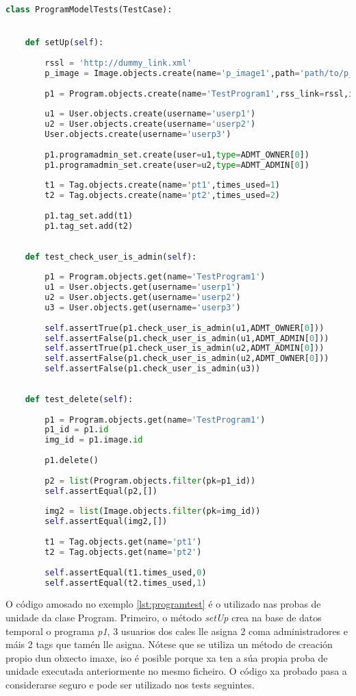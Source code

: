 \begin{lstlisting}[language=Python, caption=Probas de unidade dos metodos de Program, label=lst:programtest]
class ProgramModelTests(TestCase): 


	def setUp(self):
	
		rssl = 'http://dummy_link.xml'
		p_image = Image.objects.create(name='p_image1',path='path/to/p_image1')
		
		p1 = Program.objects.create(name='TestProgram1',rss_link=rssl,image=p_image)
		
		u1 = User.objects.create(username='userp1')
		u2 = User.objects.create(username='userp2')
		User.objects.create(username='userp3')
		
		p1.programadmin_set.create(user=u1,type=ADMT_OWNER[0])
		p1.programadmin_set.create(user=u2,type=ADMT_ADMIN[0])
		
		t1 = Tag.objects.create(name='pt1',times_used=1)
		t2 = Tag.objects.create(name='pt2',times_used=2)
		
		p1.tag_set.add(t1)
		p1.tag_set.add(t2)
	
	
	def test_check_user_is_admin(self):
	
		p1 = Program.objects.get(name='TestProgram1')
		u1 = User.objects.get(username='userp1')
		u2 = User.objects.get(username='userp2')
		u3 = User.objects.get(username='userp3')
		
		self.assertTrue(p1.check_user_is_admin(u1,ADMT_OWNER[0]))
		self.assertFalse(p1.check_user_is_admin(u1,ADMT_ADMIN[0]))
		self.assertTrue(p1.check_user_is_admin(u2,ADMT_ADMIN[0]))
		self.assertFalse(p1.check_user_is_admin(u2,ADMT_OWNER[0]))
		self.assertFalse(p1.check_user_is_admin(u3))
	
	
	def test_delete(self):
	
		p1 = Program.objects.get(name='TestProgram1')
		p1_id = p1.id
		img_id = p1.image.id
		
		p1.delete()
		
		p2 = list(Program.objects.filter(pk=p1_id))
		self.assertEqual(p2,[])
		
		img2 = list(Image.objects.filter(pk=img_id))
		self.assertEqual(img2,[])
		
		t1 = Tag.objects.get(name='pt1')
		t2 = Tag.objects.get(name='pt2')
		
		self.assertEqual(t1.times_used,0)
		self.assertEqual(t2.times_used,1)

\end{lstlisting}
 

O código amosado no exemplo \ref{lst:programtest} é o utilizado nas probas de unidade da clase Program. Primeiro, o método \textit{setUp} crea na base de datos temporal o programa \textit{p1}, 3 usuarios dos cales lle asigna 2 coma administradores e máis 2 tags que tamén lle asigna. Nótese que se utiliza un método de creación propio dun obxecto imaxe, iso é posible porque xa ten a súa propia proba de unidade executada anteriormente no mesmo ficheiro. O código xa probado pasa a considerarse seguro e pode ser utilizado nos tests seguintes.

